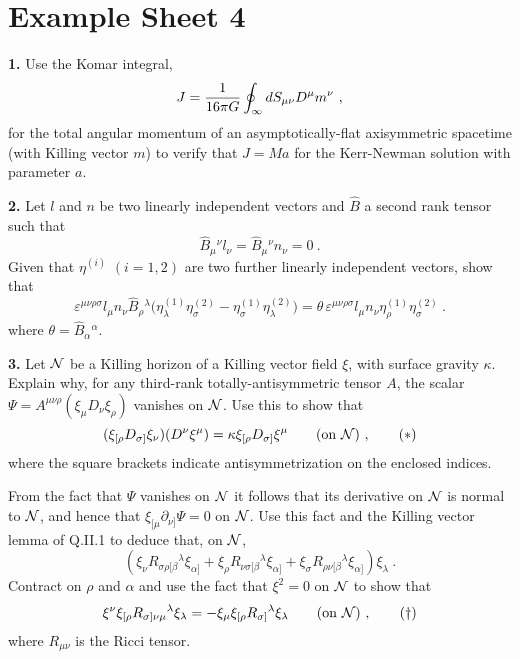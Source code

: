 \vfill\eject


\section{Example Sheet 4}

\noindent
{\bf 1.} Use the Komar integral,
$$
J= {1\over 16\pi G}\oint_\infty dS_{\mu\nu}D^\mu m^\nu\ ,
$$
for the total angular momentum of an asymptotically-flat axisymmetric
spacetime (with Killing vector $m$) to verify that $J=Ma$ for the
Kerr-Newman solution with parameter $a$.

\vskip 10pt
\noindent
{\bf 2.} Let $l$ and $n$ be two linearly independent vectors and
$\hat B$ a second rank tensor such that
$$
\hat B_\mu{}^\nu l_\nu =\hat B_\mu{}^\nu n_\nu =0\ .
$$
Given that $\eta^{(i)}$ $(i=1,2)$ are two further linearly
independent vectors, show that
$$
\varepsilon^{\mu\nu\rho\sigma}l_\mu n_\nu \hat B_\rho{}^\lambda
\big(\eta^{(1)}_\lambda\eta^{(2)}_\sigma - 
\eta^{(1)}_\sigma\eta^{(2)}_\lambda\big) =  \theta\, 
\varepsilon^{\mu\nu\rho\sigma} l_\mu n_\nu
\eta_\rho^{(1)}\eta_\sigma^{(2)}\ .
$$
where $\theta= \hat B_\alpha{}^\alpha$.

\vskip 10pt
\noindent
{\bf 3.} Let ${\cal N}$ be a Killing horizon of a Killing vector field
$\xi$, with surface gravity $\kappa$. Explain why, for any third-rank
totally-antisymmetric tensor $A$, the scalar 
$\Psi = A^{\mu\nu\rho}(\xi_\mu D_\nu\xi_\rho)$ vanishes on ${\cal N}$.
Use this to show that
$$
(\xi_{[\rho}D_{\sigma]} \xi_\nu)(D^\nu\xi^\mu) =\kappa
\xi_{[\rho}D_{\sigma]}\xi^\mu \qquad ({\rm on}\ {\cal N})\ ,\qquad (*)
$$
where the square brackets indicate antisymmetrization on the enclosed
indices.

From the fact that $\Psi$ vanishes on ${\cal N}$ it follows that its
derivative on ${\cal N}$ is normal to ${\cal N}$, and hence that
$\xi_{[\mu}\partial_{\nu]}\Psi=0$ on ${\cal N}$. Use this fact and the
Killing vector lemma of Q.II.1 to deduce that, on ${\cal N}$,
$$
(\xi_\nu R_{\sigma\rho[\beta}{}^\lambda\xi_{\alpha]}
+\xi_\rho R_{\nu\sigma[\beta}{}^\lambda\xi_{\alpha]}
+\xi_\sigma R_{\rho\nu[\beta}{}^\lambda\xi_{\alpha]})\xi_\lambda\ .
$$
Contract on $\rho$ and $\alpha$ and use the fact that $\xi^2=0$ on
${\cal N}$ to show that
$$
\xi^\nu\xi_{[\rho}R_{\sigma]\nu\mu}{}^\lambda\xi_\lambda =
-\xi_\mu\xi_{[\rho}R_{\sigma]}{}^\lambda\xi_\lambda
\qquad ({\rm on}\ {\cal N})\ ,\qquad (\dagger)
$$
where $R_{\mu\nu}$ is the Ricci tensor.

